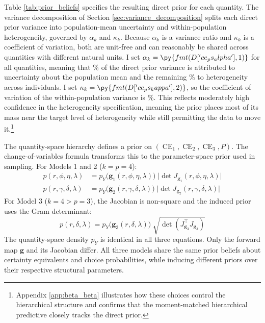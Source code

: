 \documentclass[12pt,a4paper]{article}
\theoremstyle{definition}
\theoremstyle{remark}
\DeclareMathOperator{\CE}{CE}
\newcommand{\bg}{\mathbf{g}}
\begin{document}
Table \ref{tab:prior_beliefs} specifies the resulting direct prior for each
quantity. The variance decomposition of Section
\ref{sec:variance_decomposition} splits each direct prior variance into
population-mean uncertainty and within-population heterogeneity, governed by
$\alpha_k$ and $\kappa_k$. Because $\alpha_k$ is a variance ratio and $\kappa_k$ is
a coefficient of variation, both are unit-free and can reasonably be shared
across quantities with different natural units. I set $\alpha_k =
\py{fmt(D['ce_ps_alpha'], 1)}$ for all quantities, meaning that
\% of the direct prior variance is attributed to
uncertainty about the population mean and the remaining
\% to heterogeneity across individuals. I
set $\kappa_k = \py{fmt(D['ce_ps_kappa'], 2)}$, so the coefficient of variation
of the within-population variance is \%. This
reflects moderately high confidence in the heterogeneity specification, meaning
the prior places most of its mass near the target level of heterogeneity while
still permitting the data to move it.\footnote{
  Appendix \ref{app:beta_beta} illustrates how these choices control the
  hierarchical structure and confirms that the moment-matched hierarchical
  predictive closely tracks the direct prior.
}

The quantity-space hierarchy defines a prior on $(\CE_1, \CE_2, \CE_3,
P)$. The change-of-variables formula transforms this to the parameter-space
prior used in sampling. For Models 1 and 2 ($k = p = 4$):
\begin{align}
  \label{eq:jacobian_prior_rdu}
  p(r, \phi, \eta, \lambda)
    &= p_Y\!\bigl(\bg_1(r, \phi, \eta, \lambda)\bigr)\;
      \bigl|\!\det J_{\bg_1}(r, \phi, \eta, \lambda)\bigr| \\
  \label{eq:jacobian_prior_ge}
  p(r, \gamma, \delta, \lambda)
    &= p_Y\!\bigl(\bg_2(r, \gamma, \delta, \lambda)\bigr)\;
      \bigl|\!\det J_{\bg_2}(r, \gamma, \delta, \lambda)\bigr|
\end{align}
For Model 3 ($k = 4 > p = 3$), the Jacobian is non-square and the induced
prior uses the Gram determinant:
\begin{equation}
  \label{eq:jacobian_prior_power}
  p(r, \delta, \lambda)
    = p_Y\!\bigl(\bg_3(r, \delta, \lambda)\bigr)\;
      \sqrt{\det\!\left(J_{\bg_3}^\top J_{\bg_3}\right)}
\end{equation}
The quantity-space density $p_Y$ is identical in all three equations. Only the
forward map $\bg$ and its Jacobian differ. All three models share the same
prior beliefs about certainty equivalents and choice probabilities, while
inducing different priors over their respective structural parameters.
\end{document}
